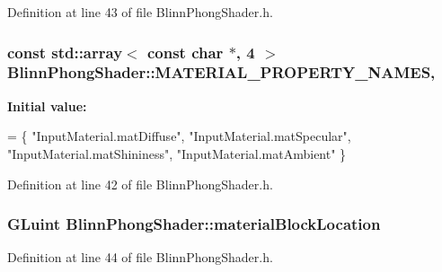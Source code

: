 Definition at line 43 of file Blinn\+Phong\+Shader.\+h.

\hypertarget{class_blinn_phong_shader_a3c74161a2680b16786f2c97f04e4ee20}{}
\subsubsection[{M\+A\+T\+E\+R\+I\+A\+L\+\_\+\+P\+R\+O\+P\+E\+R\+T\+Y\+\_\+\+N\+A\+M\+E\+S}]{\setlength{\rightskip}{0pt plus 5cm}const std\+::array$<$ const char $\ast$, 4 $>$ Blinn\+Phong\+Shader\+::\+M\+A\+T\+E\+R\+I\+A\+L\+\_\+\+P\+R\+O\+P\+E\+R\+T\+Y\+\_\+\+N\+A\+M\+E\+S\hspace{0.3cm}{\ttfamily [static]}, {\ttfamily [protected]}}\label{class_blinn_phong_shader_a3c74161a2680b16786f2c97f04e4ee20}
{\bfseries Initial value\+:}
\begin{DoxyCode}
= \{
    \textcolor{stringliteral}{"InputMaterial.matDiffuse"}, 
    \textcolor{stringliteral}{"InputMaterial.matSpecular"}, 
    \textcolor{stringliteral}{"InputMaterial.matShininess"}, 
    \textcolor{stringliteral}{"InputMaterial.matAmbient"}
\}
\end{DoxyCode}


Definition at line 42 of file Blinn\+Phong\+Shader.\+h.

\hypertarget{class_blinn_phong_shader_a4dcd123c2284945734df697501dca5ea}{}
\subsubsection[{material\+Block\+Location}]{\setlength{\rightskip}{0pt plus 5cm}G\+Luint Blinn\+Phong\+Shader\+::material\+Block\+Location\hspace{0.3cm}{\ttfamily [protected]}}\label{class_blinn_phong_shader_a4dcd123c2284945734df697501dca5ea}


Definition at line 44 of file Blinn\+Phong\+Shader.\+h.

\hypertarget{class_blinn_phong_shader_af38b3d042773f6568f0f6c227de85990}{}
